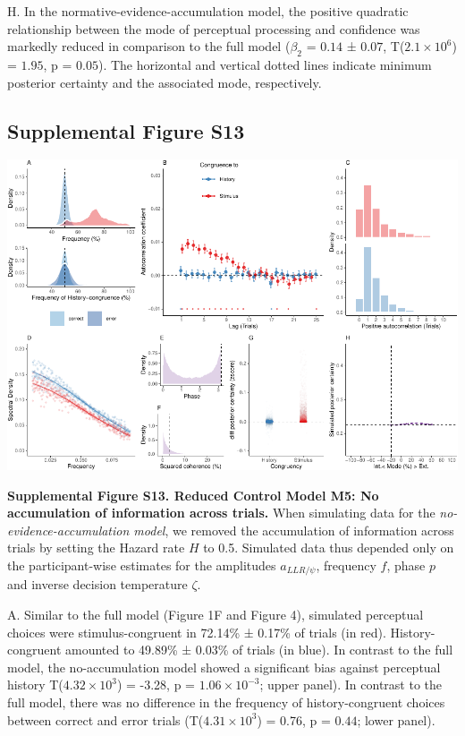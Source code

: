 \documentclass[
]{article}
\begin{document}
H. In the normative-evidence-accumulation model, the positive quadratic
relationship between the mode of perceptual processing and confidence
was markedly reduced in comparison to the full model (\(\beta_2\) =
\(0.14\) ± \(0.07\), T(\(\ensuremath{2.1\times 10^{6}}\)) = \(1.95\), p
= \(0.05\)). The horizontal and vertical dotted lines indicate minimum
posterior certainty and the associated mode, respectively.

\newpage

\hypertarget{supplemental-figure-s13}{%
\subsection{Supplemental Figure S13}\label{supplemental-figure-s13}}

\includegraphics{modes_mouse_rev2_files/figure-latex/Supplemental_Figure_S13-1.pdf}

\textbf{Supplemental Figure S13. Reduced Control Model M5: No
accumulation of information across trials.} When simulating data for the
\emph{no-evidence-accumulation model}, we removed the accumulation of
information across trials by setting the Hazard rate \(H\) to 0.5.
Simulated data thus depended only on the participant-wise estimates for
the amplitudes \(a_{LLR/\psi}\), frequency \(f\), phase \(p\) and
inverse decision temperature \(\zeta\).

A. Similar to the full model (Figure 1F and Figure 4), simulated
perceptual choices were stimulus-congruent in 72.14\% ± 0.17\% of trials
(in red). History-congruent amounted to 49.89\% ± 0.03\% of trials (in
blue). In contrast to the full model, the no-accumulation model showed a
significant bias against perceptual history
T(\ensuremath{4.32\times 10^{3}}) = -3.28, p =
\(\ensuremath{1.06\times 10^{-3}}\); upper panel). In contrast to the
full model, there was no difference in the frequency of
history-congruent choices between correct and error trials
(T(\ensuremath{4.31\times 10^{3}}) = 0.76, p = \(0.44\); lower panel).
\end{document}

